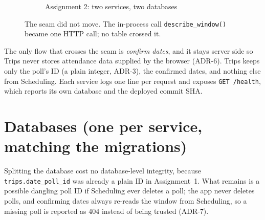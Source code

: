 \documentclass[10pt,a4paper]{article}
\newcommand{\code}[1]{\texttt{#1}}
\begin{document}
\begin{figure}[H]
\begin{subfigure}[t]{0.68\textwidth}
\caption{Assignment 2: two services, two databases}
\end{subfigure}
\caption{The seam did not move. The in-process call \code{describe\_window()} became one HTTP call; no table crossed it.}
\end{figure}

The only flow that crosses the seam is \emph{confirm dates}, and it stays server side so Trips never stores attendance data
supplied by the browser (ADR-6). Trips keeps only the poll's ID (a plain integer, ADR-3), the confirmed dates, and nothing else
from Scheduling. Each service logs one line per request and exposes \code{GET /health}, which reports its own database and the deployed commit SHA.

\section{Databases (one per service, matching the migrations)}

Splitting the database cost no database-level integrity, because \code{trips.date\_poll\_id} was already a plain ID in Assignment~1.
What remains is a possible dangling poll ID if Scheduling ever deletes a poll; the app never deletes polls, and confirming dates
always re-reads the window from Scheduling, so a missing poll is reported as 404 instead of being trusted (ADR-7).
\end{document}
